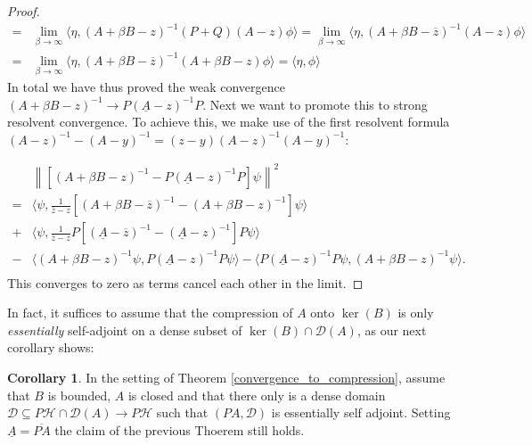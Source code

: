 \documentclass[reqno,12pt,letterpaper]{amsart}
\numberwithin{equation}{section}
\newcommand{\1}{\mathds{1}}
\theoremstyle{definition}
\newtheorem{Cor}[Th]{Corollary}
\begin{document}
\begin{proof}
\begin{align}
		=& \lim\limits_{\beta \rightarrow \infty} \langle \eta, (A + \beta B - z)^{-1} (P + Q)(A - z) \phi \rangle
		= \lim\limits_{\beta \rightarrow \infty} \langle \eta, (A + \beta B - \overline{z})^{-1} (A - z) \phi \rangle\\
		=& \lim\limits_{\beta \rightarrow \infty} \langle \eta, (A + \beta B - \overline{z})^{-1} (A + \beta B - z) \phi \rangle
		= \langle \eta,  \phi \rangle
		\end{align}
		In total we have thus proved the weak convergence 
		$
		(A + \beta B - z)^{-1} \rightarrow P (\underline{A} - z)^{-1} P
		$.
		Next we want to promote this to strong resolvent convergence. To achieve this, we make use of the first resolvent formula
		$
	(A - z)^{-1}  - 	(A - y)^{-1} = (z-y) 	(A - z)^{-1} 	(A - y)^{-1}
	$:
	
		
		\begin{align}
&	\left\|
\left[
(A + \beta B - z)^{-1} - P (\underline{A}  - z)^{-1} P 
\right] \psi
\right\|^2\\
=&   \langle  \psi, \frac{1}{\overline{z} - z} \left[ (A + \beta B - \overline{z})^{-1}  - (A + \beta B - z)^{-1} \right]\psi \rangle\\
 +& 
\langle  \psi, \frac{1}{\overline{z} - z} P \left[ (\underline{A}  - \overline{z})^{-1} -  (\underline{A}  - z)^{-1} \right] P \psi \rangle \\
-&
\langle (A + \beta B - z)^{-1} \psi, P (\underline{A}  - z)^{-1} P  \psi \rangle 
-
\langle P (\underline{A}  - z)^{-1} P  \psi, (A + \beta B - z)^{-1} \psi \rangle.\\
		\end{align}
	This converges to zero as terms cancel each other in the limit.
	\end{proof}
	In fact, it suffices to assume that the compression of $A$ onto $\ker(B)$ is only \textit{essentially} self-adjoint on a dense subset of $\ker(B)\cap \mathcal{D}(A)$, as our next corollary shows:	
	
	
	
	\begin{Cor}
		In the setting of Theorem \ref{convergence_to_compression}, assume that $B$ is bounded, $A$ is closed and that
		 there only is a dense domain $\mathcal{D} \subseteq P\mathcal{H} \cap \mathcal{D}(A) \rightarrow P\mathcal{H}$ such that $(PA, \mathcal{D})$ is essentially self adjoint. Setting $\underline{A} = \overline{PA}$ the claim of the previous Thoerem still holds.
	\end{Cor}
	
\end{document}
